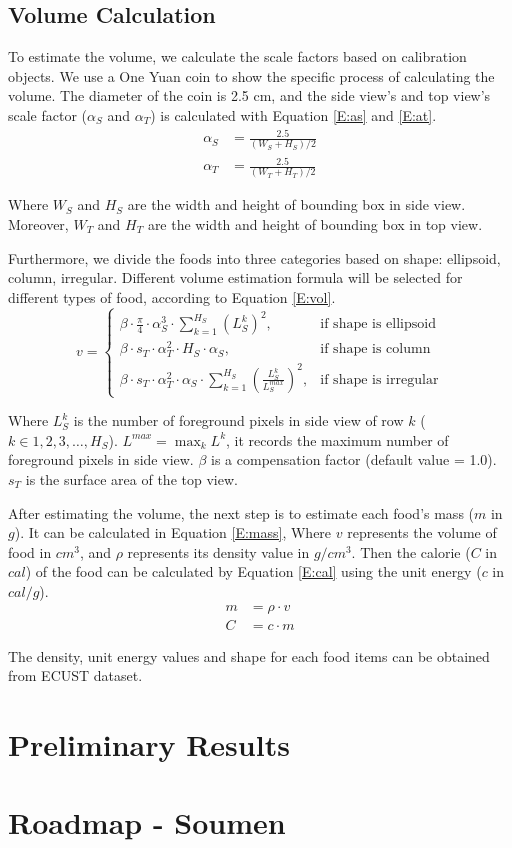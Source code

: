\documentclass[12pt, a4paper, twoside]{article}
\begin{document}
\subsection{Volume Calculation}
To estimate the volume, we calculate the scale factors based on calibration objects. We use a One Yuan coin to show the specific process of calculating the volume. The diameter of the coin is 2.5 cm, and the side view’s and top view's scale factor ($\alpha_S$ and $\alpha_T$) is calculated with Equation \ref{E:as} and \ref{E:at}.
\begin{align}
	\alpha_S &= \frac{2.5}{(W_S + H_S)/2} \label{E:as}\\
	\alpha_T &= \frac{2.5}{(W_T + H_T)/2 \label{E:at}}
\end{align}
\par
Where $W_S$ and $H_S$ are the width and height of bounding box in side view. Moreover, $W_T$ and $H_T$ are the width and height of bounding box in top view.
\par
Furthermore, we divide the foods into three categories based on shape: ellipsoid, column, irregular. Different volume estimation formula will be selected for different types of food, according to Equation \ref{E:vol}. 
\begin{equation}\label{E:vol}
	v = 
	\begin{cases}
		\beta \cdot \frac{\pi}{4} \cdot \alpha_S^3 \cdot \sum_{k=1}^{H_S} (L^k_S)^2, &\text{if shape is ellipsoid} \\
		\beta \cdot  s_T \cdot \alpha_T^2 \cdot H_S \cdot \alpha_S, &\text{if shape is column} \\
		\beta \cdot  s_T \cdot \alpha_T^2 \cdot \alpha_S \cdot \sum_{k=1}^{H_S} \left(\frac{L^k_S}{L_S^{max}}\right)^2, &\text{if shape is irregular} 
	\end{cases}
\end{equation}
\par
Where $L^k_S$ is the number of foreground pixels in side view of row $k$ ($k \in 1, 2, 3, \dots , H_S$). $L^{max} = \max_{k} L^k$, it records the maximum number of foreground pixels in side view. $\beta$ is a compensation factor (default value = 1.0).  $s_T$ is the surface area of the top view.
\par
After estimating the volume, the next step is to estimate each food’s mass ($m$ in $g$). It can be calculated in Equation \ref{E:mass}, Where $v$ represents the volume of food in $cm^3$, and  $\rho$ represents its density value in $g/cm^3$. Then the calorie ($C$ in $cal$) of the food can be calculated by Equation \ref{E:cal} using the unit energy ($c$ in $cal/g$).
\begin{align}
	m &= \rho \cdot v \label{E:mass} \\
	C &= c \cdot m \label{E:cal}
\end{align}
\par
The density, unit energy values and shape for each food items can be obtained from ECUST dataset.
\section{Preliminary Results}
\lipsum[6]

\section{Roadmap - Soumen}
\lipsum[7]\cite{ang_ml}\cite{ddl_book}

\printbibliography
\end{document}
